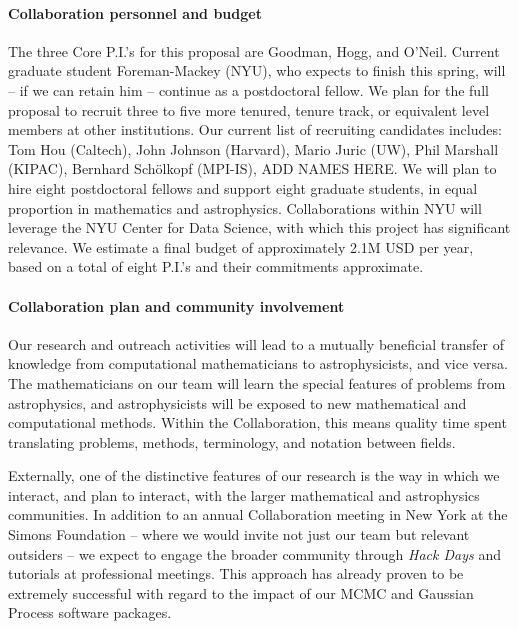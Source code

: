 \documentclass[12pt]{article}
\begin{document}
\paragraph{Collaboration personnel and budget}

The three Core P.I.'s for this proposal are Goodman, Hogg, and O'Neil.
Current graduate student Foreman-Mackey (NYU), who expects to finish
this spring, will -- if we can retain him -- continue as a postdoctoral
fellow.
We plan for the full proposal to recruit three to five more tenured,
tenure track, or equivalent level members at other institutions.  Our
current list of recruiting candidates includes: Tom Hou (Caltech), John
Johnson (Harvard), Mario Juric (UW), Phil Marshall (KIPAC), Bernhard
Sch\"olkopf (MPI-IS), ADD NAMES HERE.
We will plan to hire eight postdoctoral fellows and support eight
graduate students, in equal proportion in mathematics and astrophysics.
Collaborations within NYU will leverage the NYU Center for Data Science,
with which this project has significant relevance.
We estimate a final budget of approximately 2.1M USD per year,
based on a total of eight P.I.'s and their commitments approximate.

\paragraph{Collaboration plan and community involvement}

Our research and outreach activities will lead to a mutually beneficial
transfer of knowledge from computational mathematicians to
astrophysicists, and vice versa.
The mathematicians on our team will learn the special features of
problems from astrophysics, and astrophysicists will be exposed to new
mathematical and computational methods.
Within the Collaboration, this means quality time spent translating
problems, methods, terminology, and notation between fields.

Externally, one of the distinctive features of our research is the way
in which we interact, and plan to interact, with the larger mathematical
and astrophysics communities.
In addition to an annual Collaboration meeting in New York at the Simons
Foundation -- where we would invite not just our team but relevant
outsiders -- we expect to engage the broader community through {\em Hack
Days} and tutorials at professional meetings.
This approach has already proven to be extremely successful with regard
to the impact of our MCMC and Gaussian Process software packages.
\end{document}
